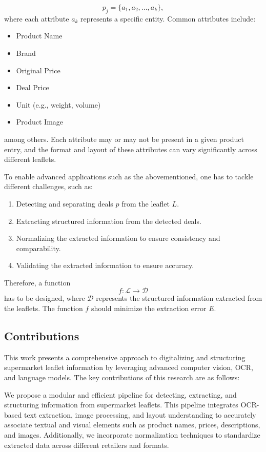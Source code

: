 \documentclass[11pt]{article}
\begin{document}
\begin{equation}
    p_j = \{a_1, a_2, ..., a_k\},   
\end{equation}
where each attribute \( a_k \) represents a specific entity. Common attributes include:
\begin{itemize}
    \item Product Name
    \item Brand
    \item Original Price
    \item Deal Price
    \item Unit (e.g., weight, volume)
    \item Product Image
\end{itemize}
among others. Each attribute may or may not be present in a given product entry, and the format and layout of these attributes can vary significantly across different leaflets.

To enable advanced applications such as the abovementioned, one has to tackle different challenges, such as:
\begin{enumerate}
    \item Detecting and separating deals $p$ from the leaflet $L$.
    \item Extracting structured information from the detected deals.
    \item Normalizing the extracted information to ensure consistency and comparability.
    \item Validating the extracted information to ensure accuracy.
\end{enumerate}

Therefore, a function $$f: \mathcal{L} \to \mathcal{D}$$ has to be designed, where $\mathcal{D}$ represents the structured information extracted from the leaflets. The function $f$ should minimize the extraction error $E$.


\subsection{Contributions}  
This work presents a comprehensive approach to digitalizing and structuring supermarket leaflet information by leveraging advanced computer vision, OCR, and language models. The key contributions of this research are as follows:  

 We propose a modular and efficient pipeline for detecting, extracting, and structuring information from supermarket leaflets. This pipeline integrates OCR-based text extraction, image processing, and layout understanding to accurately associate textual and visual elements such as product names, prices, descriptions, and images. Additionally, we incorporate normalization techniques to standardize extracted data across different retailers and formats.  
\end{document}
